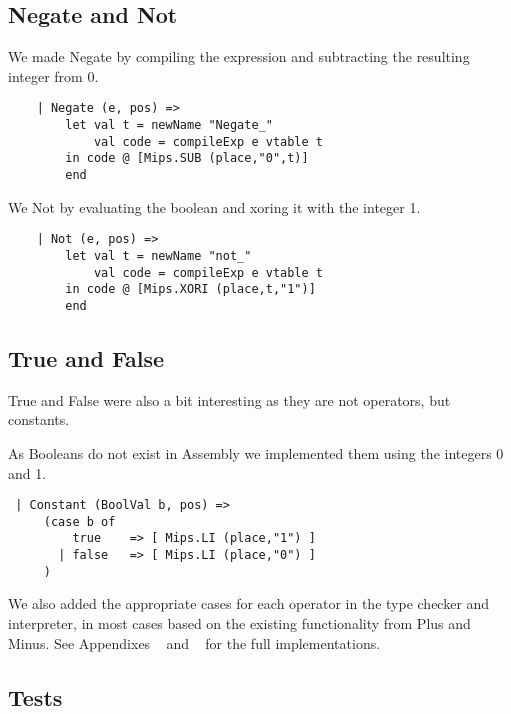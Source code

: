 \documentclass{article}
\begin{document}
\subsection{Negate and Not}
We made Negate by compiling the expression and subtracting the resulting integer from 0.
\begin{lstlisting}
    | Negate (e, pos) =>
        let val t = newName "Negate_"
            val code = compileExp e vtable t
        in code @ [Mips.SUB (place,"0",t)]
        end
\end{lstlisting}
We Not by evaluating the boolean and xoring it with the integer 1.
\begin{lstlisting}
    | Not (e, pos) =>
        let val t = newName "not_"
            val code = compileExp e vtable t
        in code @ [Mips.XORI (place,t,"1")]
        end
\end{lstlisting}

\subsection{True and False}
True and False were also a bit interesting as they are not operators, but constants.

\noindent As Booleans do not exist in Assembly we implemented them using the integers 0 and 1.
\begin{lstlisting}
 | Constant (BoolVal b, pos) => 
     (case b of
         true    => [ Mips.LI (place,"1") ]
       | false   => [ Mips.LI (place,"0") ]
     )
\end{lstlisting}

We also added the appropriate cases for each operator in the type checker and interpreter, in most cases based on the existing functionality from Plus and Minus.
See Appendixes ~ and ~ for the full implementations.

\subsection{Tests}
\end{document}
